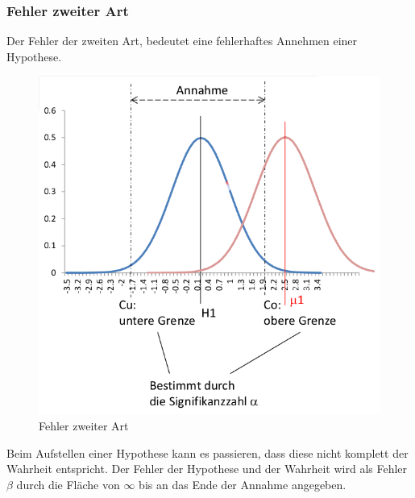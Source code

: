 \subsubsection{Fehler zweiter Art}
Der Fehler der zweiten Art, bedeutet eine fehlerhaftes Annehmen einer Hypothese. 
\begin{figure}[htb]
\centering
\includegraphics[scale=0.25]{images/exev_testverfahren_fehlerart_2.png}
\caption{Fehler zweiter Art}
\label{fig:testverfahren:fehler2}
\end{figure}
Beim Aufstellen einer Hypothese kann es passieren, dass diese nicht komplett der Wahrheit entspricht. Der Fehler der Hypothese und der Wahrheit wird als Fehler $\beta$ durch die Fläche von $\infty$ bis an das Ende der Annahme angegeben.

